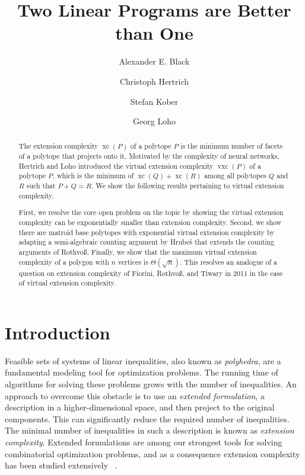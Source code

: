 \documentclass[centering,11pt,reqno]{amsart}
\title{Two Linear Programs are  Better than One}
\author[Black]{Alexander E. Black}
\author[Hertrich]{Christoph Hertrich}
\author[Kober]{Stefan Kober}
\author[Loho]{Georg Loho}
\theoremstyle{definition}
\DeclareMathOperator{\xc}{xc}
\DeclareMathOperator{\vxc}{vxc}
\begin{document}
	
\maketitle


\begin{abstract}  
The extension complexity $\xc(P)$ of a polytope $P$ is the minimum number of facets of a polytope that projects onto it. Motivated by the complexity of neural networks, Hertrich and Loho introduced the virtual extension complexity $\vxc(P)$ of a polytope $P$, which is the minimum of $\xc(Q) + \xc(R)$ among all polytopes $Q$ and $R$ such that $P+Q=R$. We show the following results pertaining to virtual extension complexity. 

First, we resolve the core open problem on the topic by showing the virtual extension complexity can be exponentially smaller than extension complexity. Second, we show there are matroid base polytopes with exponential virtual extension complexity by adapting a semi-algebraic counting argument by Hrube\v{s} that extends the counting arguments of Rothvo{\ss}. 
Finally, we show that the maximum virtual extension complexity of a polygon with $n$ vertices is $\Theta(\sqrt{n})$. This resolves an analogue of a question on extension complexity of Fiorini, Rothvo{\ss}, and Tiwary in 2011 in the case of virtual extension complexity. 
\end{abstract}


\section{Introduction}


Feasible sets of systems of linear inequalities, also known as \emph{polyhedra}, are a fundamental modeling tool for optimization problems.
  The running time of algorithms for solving these problems grows with the number of inequalities. 
  An approach to overcome this obstacle is to use an \emph{extended formulation}, a description in a higher-dimensional space, and then project to the original components.
  This can significantly reduce the required number of inequalities.
  The minimal number of inequalities in such a description is known as \emph{extension complexity}.
  Extended formulations are among our strongest tools for solving combinatorial optimization problems, and as a consequence extension complexity has been studied extensively ~\cite{ExtensionSurvey1, ExplLowBoundsExtensions}.  
  
  
\end{document}
